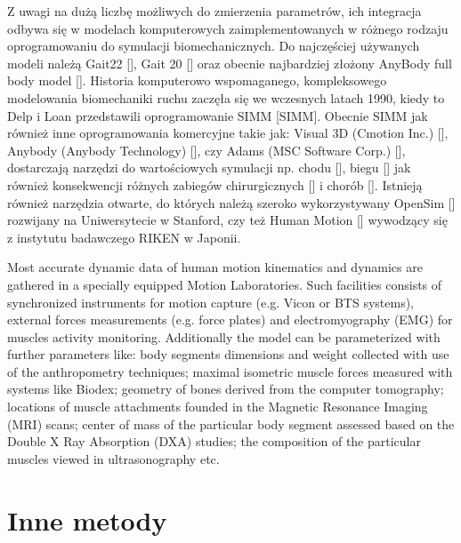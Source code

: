 Z uwagi na dużą liczbę możliwych do zmierzenia parametrów, ich integracja odbywa się w modelach komputerowych zaimplementowanych w różnego rodzaju oprogramowaniu do symulacji biomechanicznych. Do najczęściej używanych modeli należą Gait22 [], Gait 20 [] oraz obecnie najbardziej złożony AnyBody full body model []. Historia komputerowo wspomaganego, kompleksowego modelowania biomechaniki ruchu zaczęła się we wczesnych latach 1990, kiedy to Delp i Loan przedstawili oprogramowanie SIMM [SIMM]. Obecnie SIMM jak również inne oprogramowania komercyjne takie jak: Visual 3D (Cmotion Inc.) [], Anybody (Anybody Technology) [], czy Adams (MSC Software Corp.) [], dostarczają narzędzi do wartościowych symulacji np. chodu [], biegu [] jak również konsekwencji różnych zabiegów chirurgicznych [] i chorób []. Istnieją również narzędzia otwarte, do których należą szeroko wykorzystywany OpenSim [] rozwijany na Uniwersytecie w Stanford, czy też Human Motion [] wywodzący się z instytutu badawczego RIKEN w Japonii.


Most accurate dynamic data of human motion kinematics and dynamics are gathered in a specially equipped Motion Laboratories. Such facilities consists of synchronized instruments for motion capture (e.g. Vicon or BTS systems), external forces measurements (e.g. force plates) and electromyography (EMG) for muscles activity monitoring. Additionally the model can be parameterized with further parameters like: body segments dimensions and weight collected with use of the anthropometry techniques; maximal isometric muscle forces measured with systems like Biodex; geometry of bones derived from the computer tomography; locations of muscle attachments founded in the Magnetic Resonance Imaging (MRI) scans; center of mass of the particular body segment assessed based on the Double X Ray Absorption (DXA) studies; the composition of the particular muscles viewed in ultrasonography etc.






 

\section{Inne metody}